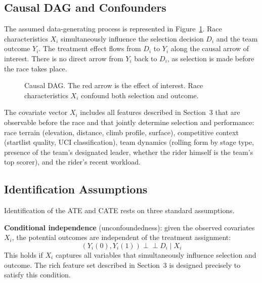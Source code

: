 \subsection{Causal DAG and Confounders}

The assumed data-generating process is represented in Figure~\ref{fig:dag}. Race characteristics $X_i$ simultaneously influence the selection decision $D_i$ and the team outcome $Y_i$. The treatment effect flows from $D_i$ to $Y_i$ along the causal arrow of interest. There is no direct arrow from $Y_i$ back to $D_i$, as selection is made before the race takes place.

\begin{figure}[H]
\centering
{}
\caption{Causal DAG. The red arrow is the effect of interest. Race characteristics $X_i$ confound both selection and outcome.}
\label{fig:dag}
\end{figure}

The covariate vector $X_i$ includes all features described in Section~3 that are observable before the race and that jointly determine selection and performance: race terrain (elevation, distance, climb profile, surface), competitive context (startlist quality, UCI classification), team dynamics (rolling form by stage type, presence of the team's designated leader, whether the rider himself is the team's top scorer), and the rider's recent workload.

\subsection{Identification Assumptions}

Identification of the ATE and CATE rests on three standard assumptions.

\textbf{Conditional independence} (unconfoundedness): given the observed covariates $X_i$, the potential outcomes are independent of the treatment assignment:
\begin{equation}
    (Y_i(0), Y_i(1)) \perp\!\!\!\perp D_i \mid X_i
    \label{eq:cia}
\end{equation}
This holds if $X_i$ captures all variables that simultaneously influence selection and outcome. The rich feature set described in Section~3 is designed precisely to satisfy this condition.

